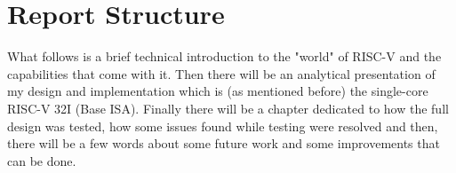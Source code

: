 	\section{Report Structure}
	\label{sec:Structure}
	
	What follows is a brief technical introduction to the "world" of RISC-V and the capabilities that come with it. Then there will be an analytical presentation of my design and implementation which is (as mentioned before) the single-core RISC-V 32I (Base ISA). Finally there will be a chapter dedicated to how the full design was tested, how some issues found while testing were resolved and then, there will be a few words about some future work and some improvements that can be done.
	
	
	
	
	
	
%